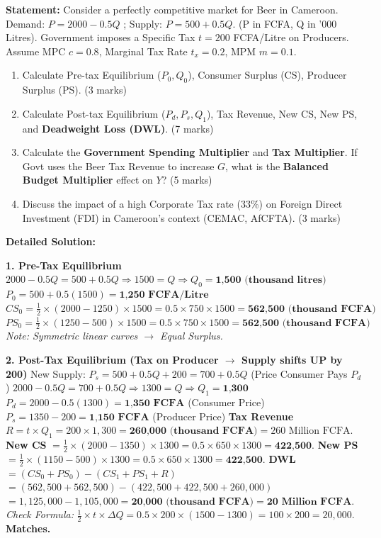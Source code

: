 \documentclass[11pt]{article}
\begin{document}
\begin{exoresolu}
\textbf{Statement:}
Consider a perfectly competitive market for Beer in Cameroon.
Demand: $P = 2000 - 0.5Q$ ; Supply: $P = 500 + 0.5Q$. (P in FCFA, Q in '000 Litres).
Government imposes a Specific Tax $t = 200$ FCFA/Litre on Producers.
Assume MPC $c = 0.8$, Marginal Tax Rate $t_x = 0.2$, MPM $m = 0.1$.
\begin{enumerate}
    \item Calculate Pre-tax Equilibrium ($P_0, Q_0$), Consumer Surplus (CS), Producer Surplus (PS). (3 marks)
    \item Calculate Post-tax Equilibrium ($P_d, P_s, Q_1$), Tax Revenue, New CS, New PS, and \textbf{Deadweight Loss (DWL)}. (7 marks)
    \item Calculate the \textbf{Government Spending Multiplier} and \textbf{Tax Multiplier}. If Govt uses the Beer Tax Revenue to increase $G$, what is the \textbf{Balanced Budget Multiplier} effect on $Y$? (5 marks)
    \item Discuss the impact of a high Corporate Tax rate (33\%) on Foreign Direct Investment (FDI) in Cameroon's context (CEMAC, AfCFTA). (3 marks)
\end{enumerate}
\tcblower
\textbf{Detailed Solution:}

\textbf{1. Pre-Tax Equilibrium}
$2000 - 0.5Q = 500 + 0.5Q \Rightarrow 1500 = Q \Rightarrow Q_0 = \textbf{1,500 (thousand litres)}$
$P_0 = 500 + 0.5(1500) = \textbf{1,250 FCFA/Litre}$
$CS_0 = \frac{1}{2} \times (2000 - 1250) \times 1500 = 0.5 \times 750 \times 1500 = \textbf{562,500 (thousand FCFA)}$
$PS_0 = \frac{1}{2} \times (1250 - 500) \times 1500 = 0.5 \times 750 \times 1500 = \textbf{562,500 (thousand FCFA)}$
\textit{Note: Symmetric linear curves $\rightarrow$ Equal Surplus.}

\textbf{2. Post-Tax Equilibrium (Tax on Producer $\rightarrow$ Supply shifts UP by 200)}
New Supply: $P_s = 500 + 0.5Q + 200 = 700 + 0.5Q$ (Price Consumer Pays $P_d$)
$2000 - 0.5Q = 700 + 0.5Q \Rightarrow 1300 = Q \Rightarrow Q_1 = \textbf{1,300}$
$P_d = 2000 - 0.5(1300) = \textbf{1,350 FCFA}$ (Consumer Price)
$P_s = 1350 - 200 = \textbf{1,150 FCFA}$ (Producer Price)
\textbf{Tax Revenue} $R = t \times Q_1 = 200 \times 1,300 = \textbf{260,000 (thousand FCFA)} = 260 \text{ Million FCFA}$.
\textbf{New CS} $= \frac{1}{2} \times (2000 - 1350) \times 1300 = 0.5 \times 650 \times 1300 = \textbf{422,500}$.
\textbf{New PS} $= \frac{1}{2} \times (1150 - 500) \times 1300 = 0.5 \times 650 \times 1300 = \textbf{422,500}$.
\textbf{DWL} $= (CS_0 + PS_0) - (CS_1 + PS_1 + R)$
$= (562,500 + 562,500) - (422,500 + 422,500 + 260,000)$
$= 1,125,000 - 1,105,000 = \textbf{20,000 (thousand FCFA)} = \textbf{20 Million FCFA}$.
\textit{Check Formula:} $\frac{1}{2} \times t \times \Delta Q = 0.5 \times 200 \times (1500-1300) = 100 \times 200 = 20,000$. \textbf{Matches.}


\end{exoresolu}
\end{document}
